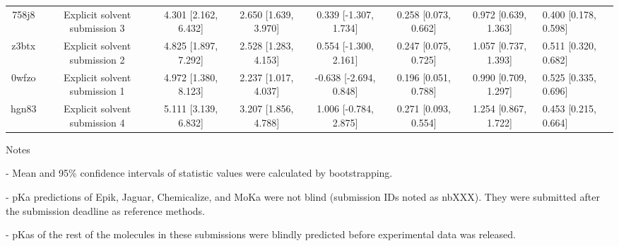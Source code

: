 \documentclass{article}
\begin{document}
\begin{center}
\begin{longtable}{|ccccccc|}
 758j8 &                      Explicit solvent submission 3 &  4.301 [2.162, 6.432] &  2.650 [1.639, 3.970] &    0.339 [-1.307, 1.734] &  0.258 [0.073, 0.662] &   0.972 [0.639, 1.363] &  0.400 [0.178, 0.598] \\
 z3btx &                      Explicit solvent submission 2 &  4.825 [1.897, 7.292] &  2.528 [1.283, 4.153] &    0.554 [-1.300, 2.161] &  0.247 [0.075, 0.725] &   1.057 [0.737, 1.393] &  0.511 [0.320, 0.682] \\
 0wfzo &                      Explicit solvent submission 1 &  4.972 [1.380, 8.123] &  2.237 [1.017, 4.037] &   -0.638 [-2.694, 0.848] &  0.196 [0.051, 0.788] &   0.990 [0.709, 1.297] &  0.525 [0.335, 0.696] \\
 hgn83 &                      Explicit solvent submission 4 &  5.111 [3.139, 6.832] &  3.207 [1.856, 4.788] &    1.006 [-0.784, 2.875] &  0.271 [0.093, 0.554] &   1.254 [0.867, 1.722] &  0.453 [0.215, 0.664] \\
\end{longtable}
\end{center}

Notes

- Mean and 95\% confidence intervals of statistic values were calculated by bootstrapping.

- pKa predictions of Epik, Jaguar, Chemicalize, and MoKa were not blind (submission IDs noted as nbXXX). They were submitted after the submission deadline as reference methods.

- pKas of the rest of the molecules in these submissions were blindly predicted before experimental data was released.
\end{document}
